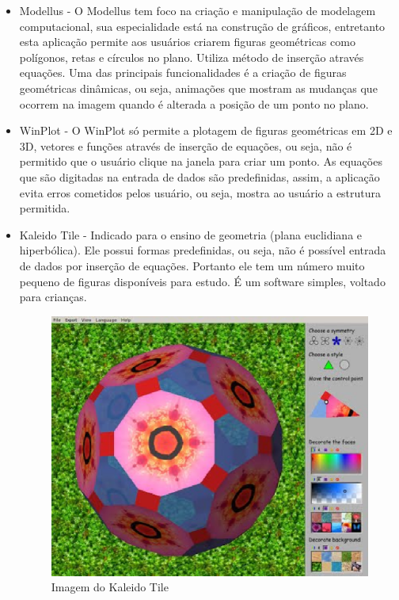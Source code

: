 \documentclass[12pt,a4paper]{article}
\begin{document}
\begin{itemize}
\begin{itemize}
		\item Modellus - O Modellus tem foco na criação e manipulação de modelagem computacional, sua especialidade está na construção de gráficos, entretanto esta aplicação permite aos usuários criarem figuras geométricas como polígonos, retas e círculos no plano. Utiliza método de inserção através equações. Uma das principais funcionalidades é a criação de figuras geométricas dinâmicas, ou seja, animações que mostram as mudanças que ocorrem na imagem quando é alterada a posição de um ponto no plano.
		\item WinPlot - O WinPlot só permite a plotagem de figuras geométricas em 2D e 3D, vetores e funções através de inserção de equações, ou seja, não é permitido que o usuário clique na janela para criar um ponto. As equações que são digitadas na entrada de dados são predefinidas, assim, a aplicação evita erros cometidos pelos usuário, ou seja, mostra ao usuário a estrutura permitida.
		\item Kaleido Tile - Indicado para o ensino de geometria (plana euclidiana e hiperbólica). Ele possui formas predefinidas, ou seja, não é possível entrada de dados por inserção de equações. Portanto ele tem um número muito pequeno de figuras disponíveis para estudo. É um software simples, voltado para crianças.
		
		\begin{figure}[htb]
			\centering
			\includegraphics[scale=0.6]{imagens/tile.eps} 
			\caption{Imagem do Kaleido Tile}
			\label{fig:imgKaleidoTile}
		\end{figure}


\end{itemize}
\end{itemize}
\end{document}
